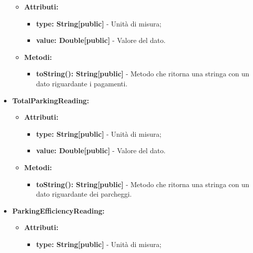 \documentclass[8pt]{article}
\begin{document}
\begin{itemize}
\begin{itemize}
	\setlength\itemsep{0em}
        \item \textbf{Attributi:}
        \begin{itemize}
	\setlength\itemsep{0em}
            \item \textbf{type: String[public]} - Unità di misura;
            \item \textbf{value: Double[public]} - Valore del dato.
        \end{itemize}
    \end{itemize}
    \begin{itemize}
	\setlength\itemsep{0em}
        \item \textbf{Metodi:}
        \begin{itemize}
	\setlength\itemsep{0em}
            \item \textbf{toString(): String[public]} - Metodo che ritorna una stringa con un dato riguardante i pagamenti.
        \end{itemize}
    \end{itemize}
    \item \textbf{TotalParkingReading:}
    \begin{itemize}
	\setlength\itemsep{0em}
        \item \textbf{Attributi:}
        \begin{itemize}
	\setlength\itemsep{0em}
            \item \textbf{type: String[public]} - Unità di misura;
            \item \textbf{value: Double[public]} - Valore del dato.
        \end{itemize}
    \end{itemize}
    \begin{itemize}
	\setlength\itemsep{0em}
        \item \textbf{Metodi:}
        \begin{itemize}
	\setlength\itemsep{0em}
            \item \textbf{toString(): String[public]} - Metodo che ritorna una stringa con un dato riguardante dei parcheggi.
        \end{itemize}
    \end{itemize}
    \item \textbf{ParkingEfficiencyReading:}
    \begin{itemize}
	\setlength\itemsep{0em}
        \item \textbf{Attributi:}
        \begin{itemize}
	\setlength\itemsep{0em}
            \item \textbf{type: String[public]} - Unità di misura;

\end{itemize}
\end{itemize}
\end{itemize}
\end{document}
